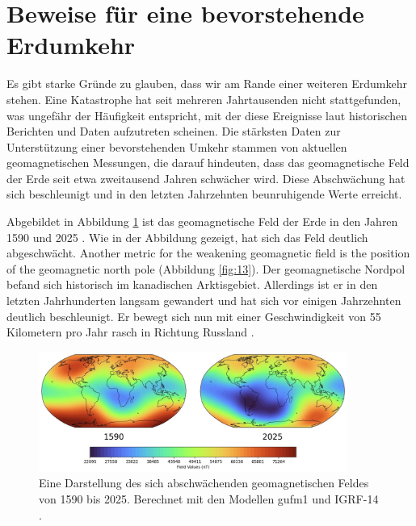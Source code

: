 \documentclass[10pt,twocolumn,letterpaper]{article}
\begin{document}
\section{Beweise für eine bevorstehende Erdumkehr}

Es gibt starke Gründe zu glauben, dass wir am Rande einer weiteren Erdumkehr stehen. Eine Katastrophe hat seit mehreren Jahrtausenden nicht stattgefunden, was ungefähr der Häufigkeit entspricht, mit der diese Ereignisse laut historischen Berichten und Daten aufzutreten scheinen. Die stärksten Daten zur Unterstützung einer bevorstehenden Umkehr stammen von aktuellen geomagnetischen Messungen, die darauf hindeuten, dass das geomagnetische Feld der Erde seit etwa zweitausend Jahren schwächer wird. Diese Abschwächung hat sich beschleunigt und in den letzten Jahrzehnten beunruhigende Werte erreicht.

Abgebildet in Abbildung \ref{fig:14} ist das geomagnetische Feld der Erde in den Jahren 1590 und 2025 \cite{125,126}. Wie in der Abbildung gezeigt, hat sich das Feld deutlich abgeschwächt.
Another metric for the weakening geomagnetic field is the position of the geomagnetic north pole (Abbildung \ref{fig:13}). Der geomagnetische Nordpol befand sich historisch im kanadischen Arktisgebiet. Allerdings ist er in den letzten Jahrhunderten langsam gewandert und hat sich vor einigen Jahrzehnten deutlich beschleunigt. Er bewegt sich nun mit einer Geschwindigkeit von 55 Kilometern pro Jahr rasch in Richtung Russland \cite{124}.

\begin{figure}[t]
\begin{center}
\includegraphics[width=0.9\textwidth]{saa.jpg}
\end{center}
   \caption{Eine Darstellung des sich abschwächenden geomagnetischen Feldes von 1590 bis 2025. Berechnet mit den Modellen gufm1 und IGRF-14 \cite{125,126}.}
\label{fig:14}
\end{figure}
\end{document}
